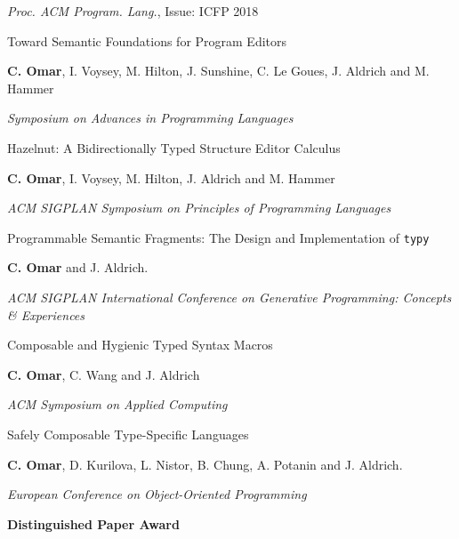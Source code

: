 \documentclass[10pt,letterpaper]{article}
\renewenvironment{itemize}{
  \begin{list}{}{
    \setlength{\leftmargin}{1.25em}
    \setlength{\itemsep}{0.25em}
    \setlength{\parskip}{0pt}
    \setlength{\parsep}{0.2em}
  }
}{
  \end{list}
}
\begin{document}
\begin{enumerate}[leftmargin=*, labelindent=6.5em, font=\bfseries]
\begin{itemize}
          \item \textit{Proc. ACM Program. Lang.}, Issue: ICFP 2018
        \end{itemize}
  \item[SNAPL 2018] Toward Semantic Foundations for Program Editors
        \begin{itemize}
          \item \textbf{C. Omar}, I. Voysey, M. Hilton, J. Sunshine, C. Le Goues, J. Aldrich and M. Hammer
          \item \textit{Symposium on Advances in Programming Languages} 
        \end{itemize}
  \item[POPL 2017] {Hazelnut: A Bidirectionally Typed Structure Editor Calculus}
        \begin{itemize}
          \item \textbf{C. Omar}, I. Voysey, M. Hilton, J. Aldrich and M. Hammer
          \item \textit{ACM SIGPLAN Symposium on Principles of Programming Languages} 
        \end{itemize}
  \item[GPCE 2016] {Programmable Semantic Fragments: The Design and Implementation of \texttt{typy}}
        \begin{itemize}
          \item \textbf{C. Omar} and J. Aldrich.
          \item \textit{ACM SIGPLAN International Conference on Generative Programming: Concepts \& Experiences}
        \end{itemize}
  \item[SAC 2015] Composable and Hygienic Typed Syntax Macros
        \begin{itemize}
          \item \textbf{C. Omar}, C. Wang and J. Aldrich
          \item \textit{ACM Symposium on Applied Computing}
        \end{itemize}
  \item[ECOOP 2014] {Safely Composable Type-Specific Languages}
        \begin{itemize}
          \item \textbf{C. Omar}, D. Kurilova, L. Nistor, B. Chung, A. Potanin and J. Aldrich.
          \item \textit{European Conference on Object-Oriented Programming}
          \item \textbf{Distinguished Paper Award}

\end{itemize}
\end{enumerate}
\end{document}
